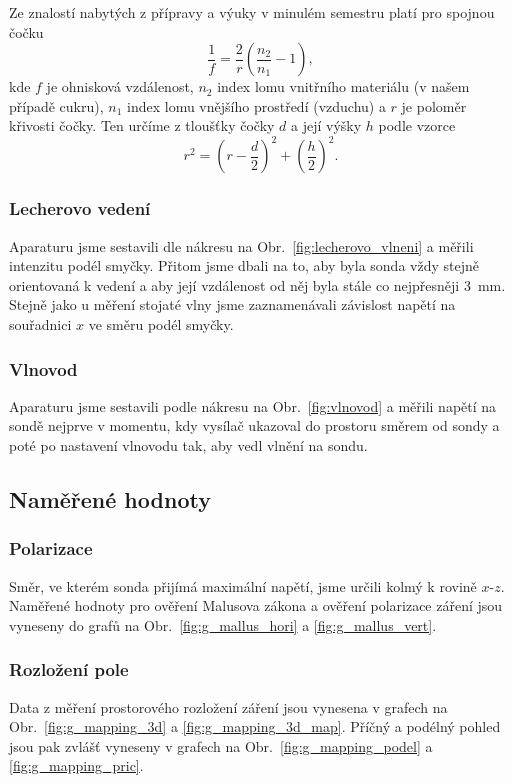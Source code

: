 \documentclass[english]{article}
\begin{document}
					Ze znalostí nabytých z přípravy a výuky v minulém semestru platí pro spojnou čočku
					\begin{equation}
					\frac{1}{f}  = \frac{2}{r}\left(\frac{n_2}{n_1} -1 \right),
					\label{eq:cocka1}
					\end{equation}
					kde $f$ je ohnisková vzdálenost, $n_2$ index lomu vnitřního materiálu (v našem případě cukru), $n_1$ index lomu vnějšího prostředí (vzduchu) a $r$ je poloměr křivosti čočky. Ten určíme z tloušťky čočky $d$ a její výšky $h$ podle vzorce
					\begin{equation}
					r^2 = \left( r - \frac{d}{2} \right)^2 + \left( \frac{h}{2} \right)^2.
					\label{eq:cocka2}
					\end{equation}
			
			\subsubsection{Lecherovo vedení}
					Aparaturu jsme sestavili dle nákresu na Obr.~\ref{fig:lecherovo_vlneni} a měřili intenzitu podél smyčky. Přitom jsme dbali na to, aby byla sonda vždy stejně orientovaná k vedení a aby její vzdálenost od něj byla stále co nejpřesněji 3~mm. Stejně jako u měření stojaté vlny jsme zaznamenávali závislost napětí na souřadnici $x$ ve směru podél smyčky. 
					
			\subsubsection{Vlnovod}
					Aparaturu jsme sestavili podle nákresu na Obr.~\ref{fig:vlnovod} a měřili napětí na sondě nejprve v momentu, kdy vysílač ukazoval do prostoru směrem od sondy a poté po nastavení vlnovodu tak, aby vedl vlnění na sondu.
			
	\subsection{Naměřené hodnoty}
			\subsubsection{Polarizace}
					Směr, ve kterém sonda přijímá maximální napětí, jsme určili kolmý k rovině $x$-$z$. Naměřené hodnoty pro ověření Malusova zákona a ověření polarizace záření jsou vyneseny do grafů na Obr.~\ref{fig:g_mallus_hori} a \ref{fig:g_mallus_vert}.
			\subsubsection{Rozložení pole}
					Data z měření prostorového rozložení záření jsou vynesena v grafech na Obr.~\ref{fig:g_mapping_3d} a \ref{fig:g_mapping_3d_map}. Příčný a podélný pohled jsou pak zvlášť vyneseny v grafech na Obr.~\ref{fig:g_mapping_podel} a 	\ref{fig:g_mapping_pric}. 
\end{document}
